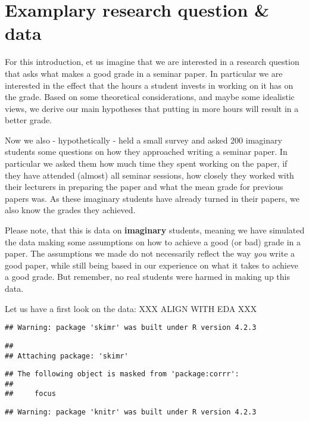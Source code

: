\documentclass[
]{book}
\begin{document}
\hypertarget{examplary-research-question-data}{%
\section{Examplary research question \& data}\label{examplary-research-question-data}}

For this introduction, et us imagine that we are interested in a research
question that asks what makes a good grade in a seminar paper. In particular we
are interested in the effect that the hours a student invests in working on it
has on the grade. Based on some theoretical considerations, and maybe some
idealistic views, we derive our main hypotheses that putting in more hours will
result in a better grade.

Now we also - hypothetically - held a small survey and asked 200 imaginary
students some questions on how they approached writing a seminar paper. In
particular we asked them how much time they spent working on the paper, if they
have attended (almost) all seminar sessions, how closely they worked with their
lecturers in preparing the paper and what the mean grade for previous papers
was. As these imaginary students have already turned in their papers, we also
know the grades they achieved.

Please note, that this is data on \textbf{imaginary} students, meaning we have
simulated the data making some assumptions on how to achieve a good (or bad)
grade in a paper. The assumptions we made do not necessarily reflect the way
\emph{you} write a good paper, while still being based in our experience on what it
takes to achieve a good grade. But remember, no real students were harmed in
making up this data.

Let us have a first look on the data:
XXX ALIGN WITH EDA XXX

\begin{verbatim}
## Warning: package 'skimr' was built under R version 4.2.3
\end{verbatim}

\begin{verbatim}
## 
## Attaching package: 'skimr'
\end{verbatim}

\begin{verbatim}
## The following object is masked from 'package:corrr':
## 
##     focus
\end{verbatim}

\begin{verbatim}
## Warning: package 'knitr' was built under R version 4.2.3
\end{verbatim}
\end{document}
